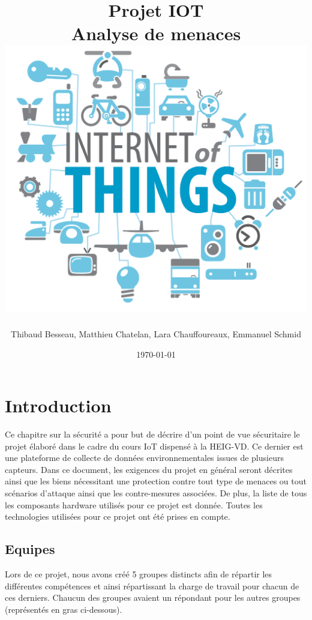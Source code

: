 \documentclass[12pt]{article}
\title{
  \vspace{-0.5cm}
  \huge{Projet IOT} \\
  \vspace{5mm}
  \Large{Analyse de menaces} \\
  \vspace{2.5cm}
  \includegraphics[width=.7\textwidth]{logo}
  \vspace{3cm}
}
\author{Thibaud Besseau, Matthieu Chatelan, Lara Chauffoureaux, Emmanuel Schmid}
\date{\today}
\begin{document}
\maketitle
\thispagestyle{empty}
\clearpage
\tableofcontents
\clearpage
\listoffigures
\clearpage
\headsep=20pt

\section{Introduction}
Ce chapitre sur la sécurité a pour but de décrire d'un point de vue sécuritaire le projet élaboré dans le cadre du cours IoT dispensé à la HEIG-VD. Ce dernier est une plateforme de collecte de données environnementales issues de plusieurs capteurs. Dans ce document, les exigences du projet en général seront décrites ainsi que les biens nécessitant une protection contre tout type de menaces ou tout scénarios d'attaque ainsi que les contre-mesures associées. De plus, la liste de tous les composants hardware utilisés pour ce projet est donnée. Toutes les technologies utilisées pour ce projet ont été prises en compte.

\subsection{Equipes}
Lors de ce projet, nous avons créé 5 groupes distincts afin de répartir les différentes compétences et ainsi répartissant la charge de travail pour chacun de ces derniers. Chaucun des groupes avaient un répondant pour les autres groupes (représentés en gras ci-dessous).
\end{document}
